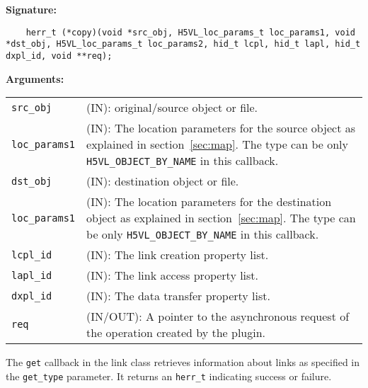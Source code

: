 \begin{mdframed}[style=bgbox]
\textbf{Signature:}
\begin{lstlisting}
    herr_t (*copy)(void *src_obj, H5VL_loc_params_t loc_params1, void *dst_obj, H5VL_loc_params_t loc_params2, hid_t lcpl, hid_t lapl, hid_t dxpl_id, void **req);
\end{lstlisting}

\textbf{Arguments:}\\
\begin{tabular}{l p{10cm}}
  \texttt{src\_obj} & (IN): original/source object or file. \\
  \texttt{loc\_params1} & (IN): The location parameters for the source
  object as explained in section~\ref{sec:map}. The type can be only \texttt{H5VL\_OBJECT\_BY\_NAME} in this callback. \\
  \texttt{dst\_obj} & (IN): destination object or file. \\
  \texttt{loc\_params1} & (IN): The location parameters for the destination
  object as explained in section~\ref{sec:map}. The type can be only \texttt{H5VL\_OBJECT\_BY\_NAME} in this callback. \\
  \texttt{lcpl\_id} & (IN): The link creation property list.\\
  \texttt{lapl\_id} & (IN): The link access property list.\\
  \texttt{dxpl\_id} & (IN): The data transfer property list.\\
  \texttt{req} & (IN/OUT): A pointer to the asynchronous request of the
  operation created by the plugin.\\
\end{tabular}
\end{mdframed}

The \texttt{get} callback in the link class retrieves information
about links as specified in the \texttt{get\_type} parameter. It
returns an \texttt{herr\_t} indicating success or failure.\bigskip

